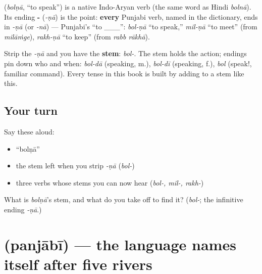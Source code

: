\begin{cousinweb}
\textbf{} (\emph{bolṇā}, \textquotedblleft{}to speak\textquotedblright{}) is a native Indo-Aryan verb (the same word as Hindi \emph{bolnā}). Its ending \textbf{-} (\emph{-ṇā}) is the point: \textbf{every} Punjabi verb, named in the dictionary, ends in \emph{-ṇā} (or \emph{-nā}) — Punjabi's \textquotedblleft{}to \_\_\_\textquotedblright{}: \emph{bol-ṇā} \textquotedblleft{}to speak,\textquotedblright{} \emph{mil-ṇā} \textquotedblleft{}to meet\textquotedblright{} (from \emph{milāṁge}), \emph{rakh-ṇā} \textquotedblleft{}to keep\textquotedblright{} (from \emph{rabb rākhā}).
\end{cousinweb}

\begin{grammarlens}[title={Grammar Lens: stem + ending}]
Strip the \emph{-ṇā} and you have the \textbf{stem}: \emph{bol-}. The stem holds the action; endings pin down who and when: \emph{bol-dā} (speaking, m.), \emph{bol-dī} (speaking, f.), \emph{bol} (speak!, familiar command). Every tense in this book is built by adding to a stem like this.
\end{grammarlens}

\subsection*{Your turn}
Say these aloud:

\begin{itemize}
\raggedright
  \item \textquotedblleft{}bolṇā\textquotedblright{}
  \item the stem left when you strip \emph{-ṇā} (\emph{bol-})
  \item three verbs whose stems you can now hear (\emph{bol-, mil-, rakh-})
\end{itemize}

\begin{tcolorbox}[breakable,colback=teal!4,colframe=teal!35!black,title={Before you move on}]
What is \emph{bolṇā}'s stem, and what do you take off to find it? (\emph{bol-}; the infinitive ending \emph{-ṇā}.)
\end{tcolorbox}
\section[\texorpdfstring{\pa{ਪੰਜਾਬੀ} (panjābī)}{ਪੰਜਾਬੀ (panjābī)}]{ (panjābī) — the language names itself after five rivers}

\label{lesson:PA-C05-panjabi}




